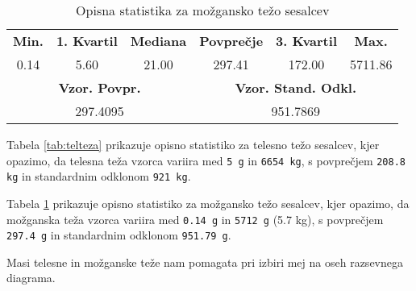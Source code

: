 \begin{table}[h]
    \centering
    \begin{tabular}{|c|c|c|c|c|c|}
    \hline
    \textbf{Min.} & \textbf{1. Kvartil} & \textbf{Mediana} & \textbf{Povprečje} & \textbf{3. Kvartil} & \textbf{Max.} \\
    0.14 & 5.60 & 21.00 & 297.41 & 172.00 & 5711.86 \\ \hline
    \multicolumn{3}{|c|}{\textbf{Vzor. Povpr.}} & \multicolumn{3}{c|}{\textbf{Vzor. Stand. Odkl.}} \\
    \multicolumn{3}{|c|}{297.4095} & \multicolumn{3}{c|}{951.7869} \\ \hline
    \end{tabular}
    \caption{Opisna statistika za možgansko težo sesalcev}
    \label{tab:mozteza}
    \end{table}

Tabela \ref{tab:telteza} prikazuje opisno statistiko za telesno težo sesalcev, kjer opazimo, da telesna teža vzorca
variira med \verb|5 g| in \verb|6654 kg|, s povprečjem \verb|208.8 kg| in standardnim odklonom \verb|921 kg|.

Tabela \ref{tab:mozteza} prikazuje opisno statistiko za možgansko težo sesalcev, kjer opazimo, da možganska teža vzorca
variira med \verb|0.14 g| in \verb|5712 g| (5.7 kg), s povprečjem \verb|297.4 g| in standardnim odklonom \verb|951.79 g|.

Masi telesne in možganske teže nam pomagata pri izbiri mej na oseh razsevnega diagrama.